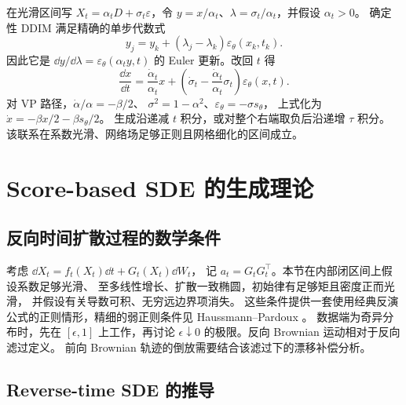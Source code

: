 在光滑区间写 \(X_t=\alpha_tD+\sigma_t\varepsilon\)，令
\(y=x/\alpha_t\)、\(\lambda=\sigma_t/\alpha_t\)，并假设 \(\alpha_t>0\)。
确定性 DDIM 满足精确的单步代数式
\[
 y_j=y_k+(\lambda_j-\lambda_k)\varepsilon_\theta(x_k,t_k).
\]
因此它是 \(\dd y/\dd\lambda=\varepsilon_\theta(\alpha_t y,t)\)
的 Euler 更新。改回 \(t\) 得
\begin{equation}
 \frac{\dd x}{\dd t}=\frac{\dot\alpha_t}{\alpha_t}x+
 \left(\dot\sigma_t-\frac{\dot\alpha_t}{\alpha_t}\sigma_t\right)
 \varepsilon_\theta(x,t).
 \label{eq:generation-ddim-ode}
\end{equation}
对 VP 路径，\(\dot\alpha/\alpha=-\beta/2\)、
\(\sigma^2=1-\alpha^2\)、\(\varepsilon_\theta=-\sigma s_\theta\)，
上式化为 \(\dot x=-\beta x/2-\beta s_\theta/2\)。
生成沿递减 \(t\) 积分，或对整个右端取负后沿递增 \(\tau\) 积分。
该联系在系数光滑、网络场足够正则且网格细化的区间成立。

\section{Score-based SDE 的生成理论}
\label{sec:generation-sde}

\subsection{反向时间扩散过程的数学条件}

考虑 \(\dd X_t=f_t(X_t)\dd t+G_t(X_t)\dd W_t\)，
记 \(a_t=G_tG_t^\top\)。本节在内部闭区间上假设系数足够光滑、
至多线性增长、扩散一致椭圆，初始律有足够矩且密度正而光滑，
并假设有关导数可积、无穷远边界项消失。
这些条件提供一套使用经典反演公式的正则情形，精细的弱正则条件见
Haussmann--Pardoux \cite{haussmann1986time}。
数据端为奇异分布时，先在 \([\epsilon,1]\) 上工作，再讨论
\(\epsilon\downarrow0\) 的极限。反向 Brownian 运动相对于反向滤过定义。
前向 Brownian 轨迹的倒放需要结合该滤过下的漂移补偿分析。

\subsection{Reverse-time SDE 的推导\requiredderivation}

